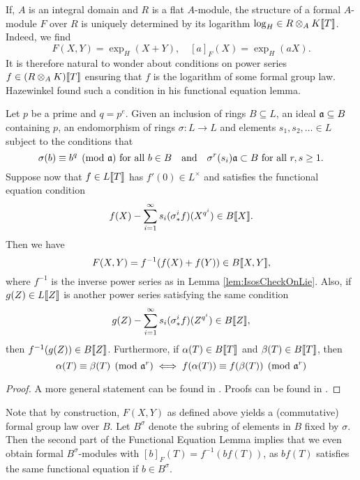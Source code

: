 If, $A$ is an integral domain and $R$ is a flat $A$-module, the structure of a formal
$A$-module $F$ over $R$ is uniquely determined by its logarithm $\log_H
\in R \otimes_A K \llbracket T \rrbracket$. Indeed, we find
\begin{equation*}
  F(X,Y) = \exp_H(X+Y), \quad [a]_F(X) = \exp_H(a X).
\end{equation*}
It is therefore natural to wonder about conditions on power series $f \in
(R\otimes_A K) \llbracket T \rrbracket$ ensuring that $f$ is the logarithm of some
formal group law. Hazewinkel found such a condition in his functional equation
lemma.

\begin{prop} 
  Let $p$ be a prime and $q = p^e$. Given an inclusion of rings $B \subseteq
  L$, an ideal $\mathfrak{a} \subseteq B$ containing $p$, an endomorphism of rings
  $\sigma: L \to L$ and elements $s_1, s_2, \dots \in L$ subject to the conditions
  that 
  \begin{equation*}
    \sigma(b) \equiv b^q \pmod {\mathfrak{a}} \text{ for all } b \in B \quad \text{and} \quad 
    \sigma^r(s_i) \mathfrak{a} \subset B \text{ for all } r,s \geq 1.
  \end{equation*}
  Suppose now that $f \in L\llbracket T \rrbracket$ has $f'(0) \in L^\times$ and
  satisfies the functional equation condition
  \begin{equation*}
    f(X) - \sum_{i=1}^\infty s_i (\sigma^i_* f)(X^{q^i}) \in B\llbracket X \rrbracket.
  \end{equation*}
  Then we have 
  \begin{equation*}
    F(X,Y) = f^{-1}(f(X) + f(Y)) \in B \llbracket X,Y \rrbracket,
  \end{equation*}
  where $f^{-1}$ is the inverse power series as in Lemma \ref{lem:IsosCheckOnLie}.
  Also, if $g(Z) \in L\llbracket Z \rrbracket$ is another power series satisfying the 
  same condition
  \begin{equation*}
    g(Z) - \sum_{i=1}^\infty s_i (\sigma^i_* f)(Z^{q^i}) \in B\llbracket Z \rrbracket,
  \end{equation*}
  then $f^{-1}(g(Z)) \in B\llbracket Z \rrbracket$. 
  Furthermore, if $\alpha(T) \in B\llbracket T \rrbracket$ and $\beta(T) \in B \llbracket T \rrbracket$, then
  \begin{equation} \label{eq:funceqlemcongruence}
    \alpha(T) \equiv \beta(T) \pmod {\mathfrak{a}^r} \iff f(\alpha(T)) \equiv f(\beta(T))
    \pmod {\mathfrak{a}^r}
  \end{equation}

  \begin{proof}
    A more general statement can be found in \cite[Section
    2]{hazewinkel1979funceqexp}. Proofs can be found in \cite[Sections 2 and
    10]{hazewinkel1978formal}.
  \end{proof}
\end{prop}
Note that by construction, $F(X,Y)$ as defined above yields a (commutative)
formal group law over $B$. 
Let $B^\sigma$ denote the subring of elements in $B$ fixed by $\sigma$. Then 
the second part of the Functional Equation Lemma implies that we even obtain
formal $B^\sigma$-modules with $[b]_F(T) = f^{-1}(b f(T))$, as $bf(T)$
satisfies the same functional equation if $b \in B^\sigma$. 


